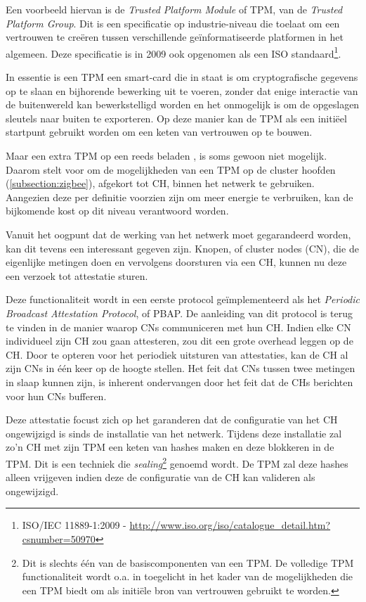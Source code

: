 Een voorbeeld hiervan is de \emph{Trusted Platform Module} of TPM, van de
\emph{Trusted Platform Group}. Dit is een specificatie op industrie-niveau die
toelaat om een vertrouwen te cre\"eren tussen verschillende ge\"informatiseerde
platformen in het algemeen. Deze specificatie is in 2009 ook opgenomen als een
ISO standaard\footnote{ISO/IEC 11889-1:2009 -
\url{http://www.iso.org/iso/catalogue_detail.htm?csnumber=50970}}.

In essentie is een TPM een smart-card die in staat is om cryptografische
gegevens op te slaan en bijhorende bewerking uit te voeren, zonder dat enige
interactie van de buitenwereld kan bewerkstelligd worden en het onmogelijk is
om de opgeslagen sleutels naar buiten te exporteren. Op deze manier kan de TPM
als een initi\"eel startpunt gebruikt worden om een keten van vertrouwen op te
bouwen.

Maar een extra TPM op een reeds beladen \mcu, is soms gewoon niet mogelijk.
Daarom stelt \cite{krauss2007detecting} voor om de mogelijkheden van een TPM op
de cluster hoofden (\ref{subsection:zigbee}), afgekort tot CH, binnen het
netwerk te gebruiken. Aangezien deze per definitie voorzien zijn om meer
energie te verbruiken, kan de bijkomende kost op dit niveau verantwoord worden.

Vanuit het oogpunt dat de werking van het netwerk moet gegarandeerd worden, kan
dit tevens een interessant gegeven zijn. Knopen, of cluster nodes (CN), die de
eigenlijke metingen doen en vervolgens doorsturen via een CH, kunnen nu deze
een verzoek tot attestatie sturen.

Deze functionaliteit wordt in een eerste protocol ge\"implementeerd als het
\emph{Periodic Broadcast Attestation Protocol}, of PBAP. De aanleiding van dit
protocol is terug te vinden in de manier waarop CNs communiceren met hun CH.
Indien elke CN individueel zijn CH zou gaan attesteren, zou dit een grote
overhead leggen op de CH. Door te opteren voor het periodiek uitsturen van
attestaties, kan de CH al zijn CNs in \'e\'en keer op de hoogte stellen. Het
feit dat CNs tussen twee metingen in slaap kunnen zijn, is inherent ondervangen
door het feit dat de CHs berichten voor hun CNs bufferen.

Deze attestatie focust zich op het garanderen dat de configuratie van het CH
ongewijzigd is sinds de installatie van het netwerk. Tijdens deze installatie
zal zo'n CH met zijn TPM een keten van hashes maken en deze blokkeren in de
TPM. Dit is een techniek die \emph{sealing}\footnote{Dit is slechts \'e\'en van
de basiscomponenten van een TPM. De volledige TPM functionaliteit wordt o.a. in
\cite{parno2010bootstrapping} toegelicht in het kader van de mogelijkheden die
een TPM biedt om als initi\"ele bron van vertrouwen gebruikt te worden.}
genoemd wordt. De TPM zal deze hashes alleen vrijgeven indien deze de
configuratie van de CH kan valideren als ongewijzigd.

